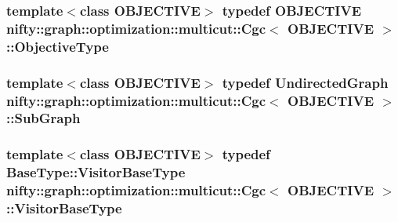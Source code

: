 \subsubsection[{Objective\+Type}]{\setlength{\rightskip}{0pt plus 5cm}template$<$class O\+B\+J\+E\+C\+T\+I\+V\+E$>$ typedef O\+B\+J\+E\+C\+T\+I\+V\+E {\bf nifty\+::graph\+::optimization\+::multicut\+::\+Cgc}$<$ O\+B\+J\+E\+C\+T\+I\+V\+E $>$\+::{\bf Objective\+Type}}\label{classnifty_1_1graph_1_1optimization_1_1multicut_1_1Cgc_a10339a861b453cdeb2e85e8371bd013d}
\hypertarget{classnifty_1_1graph_1_1optimization_1_1multicut_1_1Cgc_a477a719159f23300cd8e627a825e9275}{}
\subsubsection[{Sub\+Graph}]{\setlength{\rightskip}{0pt plus 5cm}template$<$class O\+B\+J\+E\+C\+T\+I\+V\+E$>$ typedef {\bf Undirected\+Graph} {\bf nifty\+::graph\+::optimization\+::multicut\+::\+Cgc}$<$ O\+B\+J\+E\+C\+T\+I\+V\+E $>$\+::{\bf Sub\+Graph}}\label{classnifty_1_1graph_1_1optimization_1_1multicut_1_1Cgc_a477a719159f23300cd8e627a825e9275}
\hypertarget{classnifty_1_1graph_1_1optimization_1_1multicut_1_1Cgc_adb95cdb68d34774e9a3cb4990ab54ccb}{}
\subsubsection[{Visitor\+Base\+Type}]{\setlength{\rightskip}{0pt plus 5cm}template$<$class O\+B\+J\+E\+C\+T\+I\+V\+E$>$ typedef {\bf Base\+Type\+::\+Visitor\+Base\+Type} {\bf nifty\+::graph\+::optimization\+::multicut\+::\+Cgc}$<$ O\+B\+J\+E\+C\+T\+I\+V\+E $>$\+::{\bf Visitor\+Base\+Type}}\label{classnifty_1_1graph_1_1optimization_1_1multicut_1_1Cgc_adb95cdb68d34774e9a3cb4990ab54ccb}
\hypertarget{classnifty_1_1graph_1_1optimization_1_1multicut_1_1Cgc_a0c82617574e6f1c5b2e801ed5699d725}{}
